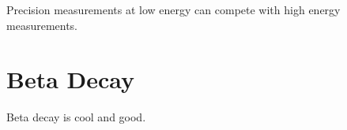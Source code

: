 Precision measurements at low energy can compete with high energy measurements.

\section{Beta Decay}
Beta decay is cool and good.

